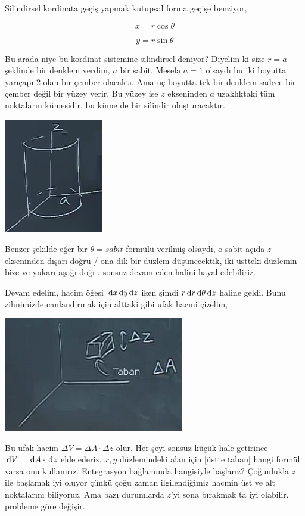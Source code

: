 \documentclass[12pt,fleqn]{article}\usepackage{../../common}
\begin{document}
Silindirsel kordinata geçiş yapmak kutupsal forma geçişe benziyor, 

$$ x = r\cos\theta $$

$$ y = r\sin\theta $$

Bu arada niye bu kordinat sistemine silindirsel deniyor? Diyelim ki size
$r = a$ şeklinde bir denklem verdim, $a$ bir sabit. Mesela $a=1$ olsaydı bu
iki boyutta yarıçapı 2 olan bir çember olacaktı. Ama üç boyutta tek bir
denklem sadece bir çember değil bir yüzey verir. Bu yüzey ise $z$
ekseninden $a$ uzaklıktaki tüm noktaların kümesidir, bu küme de bir
silindir oluşturacaktır.

\begin{center}
\includegraphics[height=5cm]{25_9.png}
\end{center}

Benzer şekilde eğer bir $\theta=sabit$ formülü verilmiş olsaydı, o sabit
açıda $z$ ekseninden dışarı doğru / ona dik bir düzlem düşünecektik, iki
üstteki düzlemin bize ve yukarı aşağı doğru sonsuz devam eden halini hayal
edebiliriz.

Devam edelim, hacim öğesi $\,\mathrm{d} x \,\mathrm{d} y \,\mathrm{d} z$ iken şimdi $r \,\mathrm{d} r \,\mathrm{d}
\theta \,\mathrm{d} z$ haline geldi. Bunu zihnimizde canlandırmak için alttaki gibi
ufak hacmi çizelim, 

\begin{center}
\includegraphics[height=5cm]{25_10.png}
\end{center}

Bu ufak hacim $\Delta V = \Delta A \cdot \Delta z$ olur. Her şeyi sonsuz
küçük hale getirince $\,\mathrm{d} V = \,\mathrm{d} A \cdot \,\mathrm{d} z$ elde ederiz, $x,y$
düzlemindeki alan için [üstte taban] hangi formül varsa onu
kullanırız. Entegrasyon bağlamında hangisiyle başlarız? Çoğunlukla $z$ ile
başlamak iyi oluyor çünkü çoğu zaman ilgilendiğimiz hacmin üst ve alt
noktalarını biliyoruz. Ama bazı durumlarda $z$'yi sona bırakmak ta iyi
olabilir, probleme göre değişir.
\end{document}
